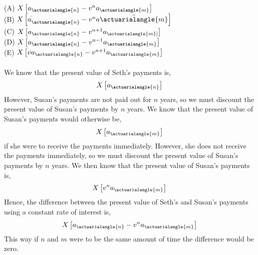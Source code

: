 \documentclass[10pt]{article}
\begin{document}
\begin{enumerate}
(A) $X\left[a_{\actuarialangle{n} }-v^{n} a_{\actuarialangle{m}}\right]$\\
(B) $X\left[a_{\actuarialangle{n}}^{\ddot{ }}-v^{n} a \ddot{\actuarialangle{m}}\right]$\\
(C) $X\left[a_{\actuarialangle{n}}-v^{n+1} a_{\actuarialangle{m}]}\right]$\\
(D) $X\left[a_{\actuarialangle{n} }-v^{n-1} a_{\actuarialangle{m}}\right]$\\
(E) $X\left[v a_{\actuarialangle{n}}-v^{n+1} a_{\actuarialangle{m}}\right]$\\

\\

We know that the present value of Seth's payments is,
$$
X\left[a_{\actuarialangle{n} }\right]\\
$$
However, Susan's payments are not paid out for $n$ years, so we must discount the present value of Susan's payments by $n$ years. We know that the present value of Susan's payments
would otherwise be,
$$
X\left[a_{\actuarialangle{m}}\right]\\
$$
if she were to receive the payments immediately. However, she does not receive the payments immediately, so we must discount the present value of Susan's payments by $n$ years. We 
then know that the present value of Susan's payments is,
$$
X\left[v^{n} a_{\actuarialangle{m}}\right]\\
$$
Hence, the difference between the present value of Seth's and Susan's payments using a constant rate of interest is,
$$
X\left[a_{\actuarialangle{n} }-v^{n} a_{\actuarialangle{m}}\right]\\
$$
This way if $n$ and $m$ were to be the same amount of time the difference would be zero.







\end{enumerate}
\end{document}
